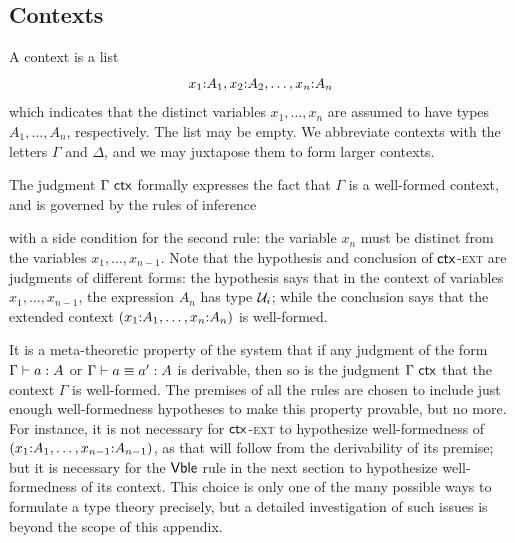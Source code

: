 \subsection{Contexts}
\label{subsec:contexts}

%
A context is a list
%
\begin{equation*}
  x_1 \mathord{:} A_1, x_2 \mathord{:} A_2, \ldots, x_n \mathord{:} A_n
\end{equation*}
%
which indicates that the distinct variables
%
$x_1, \ldots, x_n$ are assumed to have types $A_1, \ldots, A_n$, respectively. The list may be empty. We abbreviate contexts with the letters $\Gamma$ and $\Delta$, and we may juxtapose them to form larger contexts.

The judgment $\Gamma\ \mathsf{ctx}$ formally expresses the fact that $\Gamma$ is a well-formed context, and is governed by the rules of inference
%
%
with a side condition for the second rule: the variable $x_n$ must be distinct from the variables $x_1, \ldots, x_{n-1}$.
Note that the hypothesis and conclusion of $\mathsf{ctx}$-\textsc{ext} are judgments of different forms: the hypothesis says that in the context of variables $x_1, \ldots, x_{n-1}$, the expression $A_n$ has type $\mathcal{U}_i$; while the conclusion says that the extended context $(x_1 \mathord{:} A_1, \ldots, x_n \mathord{:} A_n)$ is well-formed.

It is a meta-theoretic property of the system that if any judgment of the form $\Gamma \vdash a : A$ or $\Gamma \vdash a \equiv a' : A$ is derivable, then so is the judgment $\Gamma\ \mathsf{ctx}$ that the context $\Gamma$ is well-formed.
The premises of all the rules are chosen to include just enough well-formedness hypotheses to make this property provable, but no more.
For instance, it is not necessary for $\mathsf{ctx}$-\textsc{ext} to hypothesize well-formedness of $(x_1 \mathord{:} A_1, \ldots, x_{n-1} \mathord{:} A_{n-1})$, as that will follow from the derivability of its premise; but it is necessary for the $\mathsf{Vble}$ rule in the next section to hypothesize well-formedness of its context.
This choice is only one of the many possible ways to formulate a type theory precisely, but a detailed investigation of such issues is beyond the scope of this appendix.

